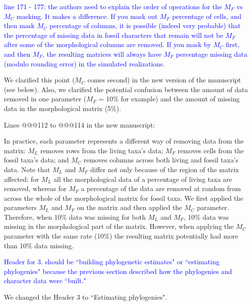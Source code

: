 \documentclass[11pt]{letter}
\begin{document}
\begin{letter}{}

\textcolor{blue}{line 171 - 177: the authors need to explain the order of operations for the $M_F$ vs $M_C$ masking. It makes a difference. If you mask out $M_F$ percentage of cells, and then mask $M_C$ percentage of columns, it is possible (indeed very probable) that the percentage of missing data in fossil characters that remain will not be $M_F$ after some of the morphological columns are removed. If you mask by $M_C$ first, and then $M_F$, the resulting matrices will always have $M_F$ percentage missing data (modulo rounding error) in the simulated realizations.}

We clarified this point ($M_C$ comes second) in the new version of the manuscript (see below). Also, we clarified the potential confusion between the amount of data removed in one parameter ($M_F$ = 10\% for example) and the amount of missing data in the morphological matrix (5\%).

Lines @@@112 to @@@114 in the new manuscript: 

\hfill\begin{minipage}{\dimexpr\textwidth-1cm}
In practice, each parameter represents a different way of removing data from the matrix: $M_L$ removes rows from the living taxa's data; $M_F$ removes cells from the fossil taxa's data; and $M_C$ removes columns across both living and fossil taxa's data. Note that $M_L$ and $M_F$ differ not only because of the region of the matrix affected: for $M_L$ all the morphological data of a percentage of living taxa are removed, whereas for $M_F$ a percentage of the data are removed at random from across the whole of the morphological matrix for fossil taxa. We first applied the parameters $M_L$ and $M_F$ on the matrix and then applied the $M_C$ parameter. Therefore, when 10\% data was missing for both $M_L$ and $M_F$, 10\% data was missing in the morphological part of the matrix. However, when applying the $M_C$ parameter with the same rate (10\%) the resulting matrix potentially had more than 10\% data missing.
\end{minipage}


\textcolor{blue}{Header for 3. should be ``building phylogenetic estimates" or ``estimating phylogenies" because the previous section described how the phylogenies and character data were ``built."}

We changed the Header 3 to ``Estimating phylogenies".



\end{letter}
\end{document}
